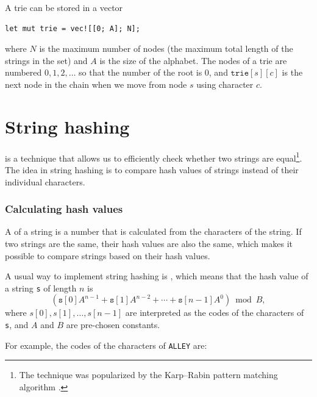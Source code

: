 A trie can be stored in a vector
\begin{lstlisting}
let mut trie = vec![[0; A]; N];
\end{lstlisting}
where $N$ is the maximum number of nodes
(the maximum total length of the strings in the set)
and $A$ is the size of the alphabet.
The nodes of a trie are numbered
$0,1,2,\ldots$ so that the number of the root is 0,
and $\texttt{trie}[s][c]$ is the next node in the chain
when we move from node $s$ using character $c$.

\section{String hashing}


 is a technique that
allows us to efficiently check whether two
strings are equal\footnote{The technique
was popularized by the Karp–Rabin pattern matching
algorithm \cite{kar87}.}.
The idea in string hashing is to compare hash values of
strings instead of their individual characters.

\subsubsection*{Calculating hash values}


A  of a string is
a number that is calculated from the characters
of the string.
If two strings are the same,
their hash values are also the same,
which makes it possible to compare strings
based on their hash values.

A usual way to implement string hashing
is , which means
that the hash value of a string \texttt{s}
of length $n$ is
\[(\texttt{s}[0] A^{n-1} + \texttt{s}[1] A^{n-2} + \cdots + \texttt{s}[n-1] A^0) \bmod B  ,\]
where $s[0],s[1],\ldots,s[n-1]$
are interpreted as the codes of the characters of \texttt{s},
and $A$ and $B$ are pre-chosen constants.

For example, the codes of the characters
of \texttt{ALLEY} are:
\begin{center}
\end{center}

